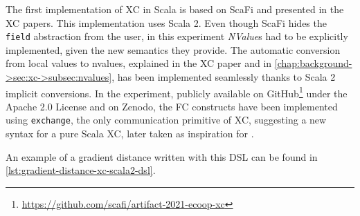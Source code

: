 The first implementation of \ac{XC} in Scala is based on ScaFi and presented in the \ac{XC} papers\cite{xc}\cite{xc-experiment-with-scafi}.
%
This implementation uses Scala 2.
%
Even though ScaFi hides the \texttt{field} abstraction from the user, in this experiment \textit{NValue}s had to be explicitly implemented, given the new semantics they provide.
%
The automatic conversion from local values to nvalues, explained in the \ac{XC} paper and in \cref{chap:background->sec:xc->subsec:nvalues}, has been implemented seamlessly thanks to Scala 2 implicit conversions.
%
In the experiment, publicly available on GitHub\footnote{\url{https://github.com/scafi/artifact-2021-ecoop-xc}} under the Apache 2.0 License and on Zenodo\cite{xc-experiment-with-scafi-code}, the \ac{FC} constructs have been implemented using \texttt{exchange}, the only communication primitive of \ac{XC}, suggesting a new syntax for a pure Scala \ac{XC}, later taken as inspiration for \this.

An example of a gradient distance written with this DSL can be found in \cref{lst:gradient-distance-xc-scala2-dsl}.


